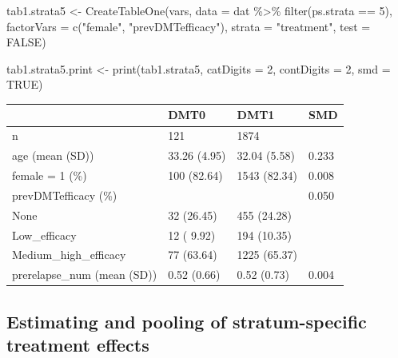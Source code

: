\documentclass[
  letterpaper,
  DIV=11,
  numbers=noendperiod]{scrreprt}
\newenvironment{Shaded}{\begin{snugshade}}{\end{snugshade}}
\newcommand{\AttributeTok}[1]{\textcolor[rgb]{0.40,0.45,0.13}{#1}}
\newcommand{\ConstantTok}[1]{\textcolor[rgb]{0.56,0.35,0.01}{#1}}
\newcommand{\DecValTok}[1]{\textcolor[rgb]{0.68,0.00,0.00}{#1}}
\newcommand{\FunctionTok}[1]{\textcolor[rgb]{0.28,0.35,0.67}{#1}}
\newcommand{\NormalTok}[1]{\textcolor[rgb]{0.00,0.23,0.31}{#1}}
\newcommand{\OtherTok}[1]{\textcolor[rgb]{0.00,0.23,0.31}{#1}}
\newcommand{\SpecialCharTok}[1]{\textcolor[rgb]{0.37,0.37,0.37}{#1}}
\newcommand{\StringTok}[1]{\textcolor[rgb]{0.13,0.47,0.30}{#1}}
\begin{document}
\begin{Shaded}
\begin{Highlighting}[]
\NormalTok{tab1.strata5 }\OtherTok{\textless{}{-}} \FunctionTok{CreateTableOne}\NormalTok{(vars, }\AttributeTok{data =}\NormalTok{ dat }\SpecialCharTok{\%\textgreater{}\%} \FunctionTok{filter}\NormalTok{(ps.strata }\SpecialCharTok{==} \DecValTok{5}\NormalTok{), }
                               \AttributeTok{factorVars =} \FunctionTok{c}\NormalTok{(}\StringTok{"female"}\NormalTok{, }\StringTok{"prevDMTefficacy"}\NormalTok{), }
                               \AttributeTok{strata =} \StringTok{"treatment"}\NormalTok{, }\AttributeTok{test =} \ConstantTok{FALSE}\NormalTok{)}

\NormalTok{tab1.strata5.print }\OtherTok{\textless{}{-}} \FunctionTok{print}\NormalTok{(tab1.strata5, }\AttributeTok{catDigits =} \DecValTok{2}\NormalTok{, }\AttributeTok{contDigits =} \DecValTok{2}\NormalTok{, }
                            \AttributeTok{smd =} \ConstantTok{TRUE}\NormalTok{)}
\end{Highlighting}
\end{Shaded}

\begin{longtable}[]{@{}llll@{}}
\toprule\noalign{}
& DMT0 & DMT1 & SMD \\
\midrule\noalign{}
\endhead
\bottomrule\noalign{}
\endlastfoot
n & 121 & 1874 & \\
age (mean (SD)) & 33.26 (4.95) & 32.04 (5.58) & 0.233 \\
female = 1 (\%) & 100 (82.64) & 1543 (82.34) & 0.008 \\
prevDMTefficacy (\%) & & & 0.050 \\
None & 32 (26.45) & 455 (24.28) & \\
Low\_efficacy & 12 ( 9.92) & 194 (10.35) & \\
Medium\_high\_efficacy & 77 (63.64) & 1225 (65.37) & \\
prerelapse\_num (mean (SD)) & 0.52 (0.66) & 0.52 (0.73) & 0.004 \\
\end{longtable}

\hypertarget{estimating-and-pooling-of-stratum-specific-treatment-effects}{%
\subsection{Estimating and pooling of stratum-specific treatment
effects}\label{estimating-and-pooling-of-stratum-specific-treatment-effects}}
\end{document}

